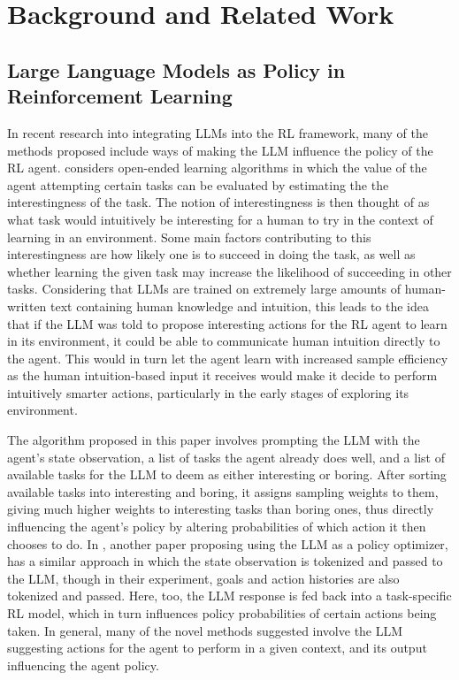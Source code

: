 \documentclass[conference]{IEEEtran}
\begin{document}
\section{Background and Related Work}

\subsection{Large Language Models as Policy in Reinforcement Learning} 

In recent research into integrating LLMs into the RL framework, many of the methods proposed include ways of making the LLM influence the policy of the RL agent. \cite{omni} considers open-ended learning algorithms in which the value of the agent attempting certain tasks can be evaluated by estimating the the interestingness of the task. The notion of interestingness is then thought of as what task would intuitively be interesting for a human to try in the context of learning in an environment. Some main factors contributing to this interestingness are how likely one is to succeed in doing the task, as well as whether learning the given task may increase the likelihood of succeeding in other tasks. Considering that LLMs are trained on extremely large amounts of human-written text containing human knowledge and intuition, this leads to the idea that if the LLM was told to propose interesting actions for the RL agent to learn in its environment, it could be able to communicate human intuition directly to the agent. This would in turn let the agent learn with increased sample efficiency as the human intuition-based input it receives would make it decide to perform intuitively smarter actions, particularly in the early stages of exploring its environment.

The algorithm proposed in this paper involves prompting the LLM with the agent's state observation, a list of tasks the agent already does well, and a list of available tasks for the LLM to deem as either interesting or boring. After sorting available tasks into interesting and boring, it assigns sampling weights to them, giving much higher weights to interesting tasks than boring ones, thus directly influencing the agent's policy by altering probabilities of which action it then chooses to do. In \cite{idm}, another paper proposing using the LLM as a policy optimizer, has a similar approach in which the state observation is tokenized and passed to the LLM, though in their experiment, goals and action histories are also tokenized and passed. Here, too, the LLM response is fed back into a task-specific RL model, which in turn influences policy probabilities of certain actions being taken. In general, many of the novel methods suggested involve the LLM suggesting actions for the agent to perform in a given context, and its output influencing the agent policy. 
\end{document}
